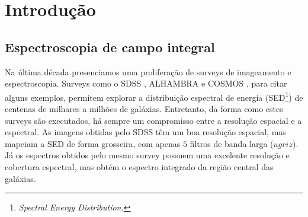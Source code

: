 


\chapter{Introdução}
\label{sec:intro}


\section{Espectroscopia de campo integral}

Na última década presenciamos uma proliferação de surveys de imageamento e
espectroscopia. Surveys como o SDSS \citep{York2000}, ALHAMBRA \citep{Moles2008}
e COSMOS \citep{Scoville2007}, para citar alguns exemplos, permitem explorar a
distribuição espectral de energia (SED\footnote{\em Spectral Energy
Distribution.}) de centenas de milhares a milhões de galáxias.
Entretanto, da forma como estes surveys são executados, há sempre um compromisso
entre a resolução espacial e a espectral. As imagens obtidas pelo SDSS têm um
boa resolução espacial, mas mapeiam a SED de forma grosseira, com apenas $5$
filtros de banda larga ($ugriz$). Já os espectros obtidos pelo mesmo survey
possuem uma excelente resolução e cobertura espectral, mas obtém o espectro
integrado da região central das galáxias.

